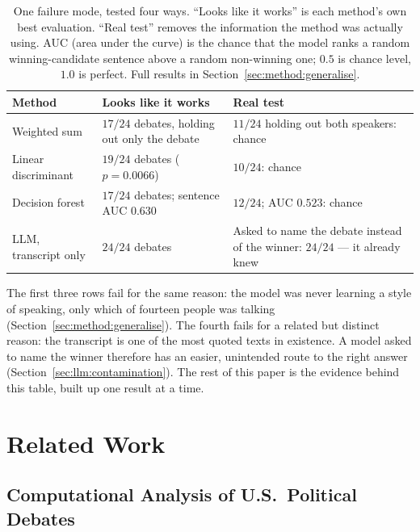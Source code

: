 \documentclass[pdflatex,sn-mathphys-num]{sn-jnl}%
\begin{document}
\begin{table}[t]
\caption{One failure mode, tested four ways. ``Looks like it works'' is
each method's own best evaluation. ``Real test'' removes the information
the method was actually using. AUC (area under the curve) is the chance
that the model ranks a random winning-candidate sentence above a random
non-winning one; $0.5$ is chance level, $1.0$ is perfect. Full results in
Section~\ref{sec:method:generalise}.}
\label{tab:overview}
\centering
\footnotesize
\setlength{\tabcolsep}{3pt}
\begin{tabular}{lp{}p{}}
\toprule
Method & Looks like it works & Real test \\
\midrule
Weighted sum & $17/24$ debates, holding out only the debate & $11/24$ holding out both speakers: chance \\
Linear discriminant & $19/24$ debates ($p=0.0066$) & $10/24$: chance \\
Decision forest & $17/24$ debates; sentence AUC $0.630$ & $12/24$; AUC $0.523$: chance \\
LLM, transcript only & $24/24$ debates & Asked to name the debate instead of the winner: $24/24$ --- it already knew \\
\bottomrule
\end{tabular}
\end{table}

The first three rows fail for the same reason: the model was never learning
a style of speaking, only which of fourteen people was talking
(Section~\ref{sec:method:generalise}). The fourth fails for a related but
distinct reason: the transcript is one of the most quoted texts in
existence. A model asked to name the winner therefore has an easier, unintended
route to the right answer (Section~\ref{sec:llm:contamination}). The rest
of this paper is the evidence behind this table, built up one result at a
time.

\section{Related Work}
\label{sec:related}

\subsection{Computational Analysis of U.S.\ Political Debates}
\label{sec:related:debates}
\end{document}
